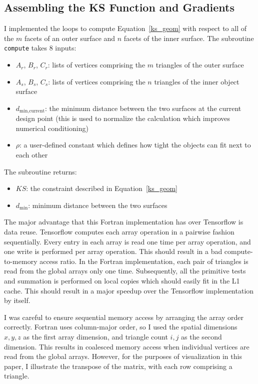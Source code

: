 \documentclass[11pt,letterpaper]{article}
\begin{document}
\subsection{Assembling the KS Function and Gradients}
\qquad I implemented the loops to compute Equation~\ref{ks_geom} with respect to all of the $m$ facets of an outer surface and $n$ facets of the inner surface.
The subroutine \texttt{compute} takes 8 inputs:

\begin{itemize}
  \item $A_r$, $B_r$, $C_r$: lists of vertices comprising the $m$ triangles of the outer surface
  \item $A_s$, $B_s$, $C_s$: lists of vertices comprising the $n$ triangles of the inner object surface
  \item $d_\text{min,current}$: the minimum distance between the two surfaces at the current design point (this is used to normalize the calculation which improves numerical conditioning)
  \item $\rho$: a user-defined constant which defines how tight the objects can fit next to each other
\end{itemize}

The subroutine returns:

\begin{itemize}
  \item $KS$: the constraint described in Equation~\ref{ks_geom}
  \item $d_\text{min}$: minimum distance between the two surfaces
\end{itemize}

\qquad The major advantage that this Fortran implementation has over Tensorflow is data reuse.
Tensorflow computes each array operation in a pairwise fashion sequentially.
Every entry in each array is read one time per array operation, and one write is performed per array operation.
This should result in a bad compute-to-memory access ratio.
In the Fortran implementation, each pair of triangles is read from the global arrays only one time.
Subsequently, all the primitive tests and summation is performed on local copies which should easily fit in the L1 cache.
This should result in a major speedup over the Tensorflow implementation by itself.

\qquad I was careful to ensure sequential memory access by arranging the array order correctly.
Fortran uses column-major order, so I used the spatial dimensions $x,y,z$ as the first array dimension, and triangle count $i,j$ as the second dimension.
This results in coalesced memory access when individual vertices are read from the global arrays.
However, for the purposes of visualization in this paper, I illustrate the transpose of the matrix, with each row comprising a triangle.
\end{document}
